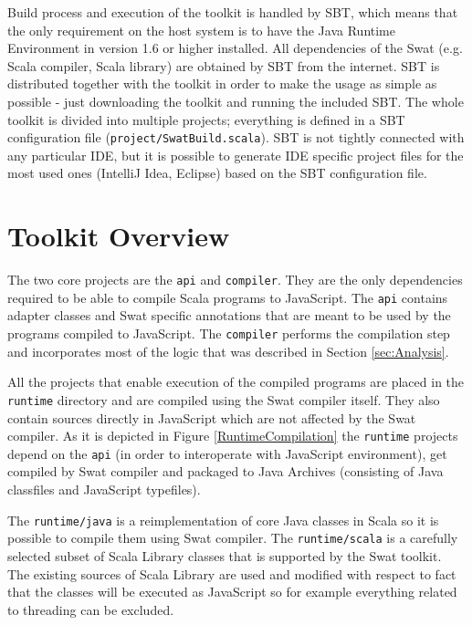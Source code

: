 \documentclass[12pt,a4paper]{report}
\begin{document}
Build process and execution of the toolkit is handled by SBT, which means that the only requirement on the host system is to have the Java Runtime Environment in version 1.6 or higher installed. All dependencies of the Swat (e.g. Scala compiler, Scala library) are obtained by SBT from the internet. SBT is distributed together with the toolkit in order to make the usage as simple as possible - just downloading the toolkit and running the included SBT. The whole toolkit is divided into multiple projects; everything is defined in a SBT configuration file (\texttt{project/SwatBuild.scala}). SBT is not tightly connected with any particular IDE, but it is possible to generate IDE specific project files for the most used ones (IntelliJ Idea, Eclipse) based on the SBT configuration file.

\section{Toolkit Overview}

The two core projects are the \texttt{api} and \texttt{compiler}. They are the only dependencies required to be able to compile Scala programs to JavaScript. The \texttt{api} contains adapter classes and Swat specific annotations that are meant to be used by the programs compiled to JavaScript. The \texttt{compiler} performs the compilation step and incorporates most of the logic that was described in Section \ref{sec:Analysis}.

All the projects that enable execution of the compiled programs are placed in the \texttt{runtime} directory and are compiled using the Swat compiler itself. They also contain sources directly in JavaScript which are not affected by the Swat compiler. As it is depicted in Figure \ref{RuntimeCompilation} the \texttt{runtime} projects depend on the \texttt{api} (in order to interoperate with JavaScript environment), get compiled by Swat compiler and packaged to Java Archives (consisting of Java classfiles and JavaScript typefiles).

The \texttt{runtime/java} is a reimplementation of core Java classes in Scala so it is possible to compile them using Swat compiler. The \texttt{runtime/scala} is a carefully selected subset of Scala Library classes that is supported by the Swat toolkit. The existing sources of Scala Library are used and modified with respect to fact that the classes will be executed as JavaScript so for example everything related to threading can be excluded.
\end{document}

